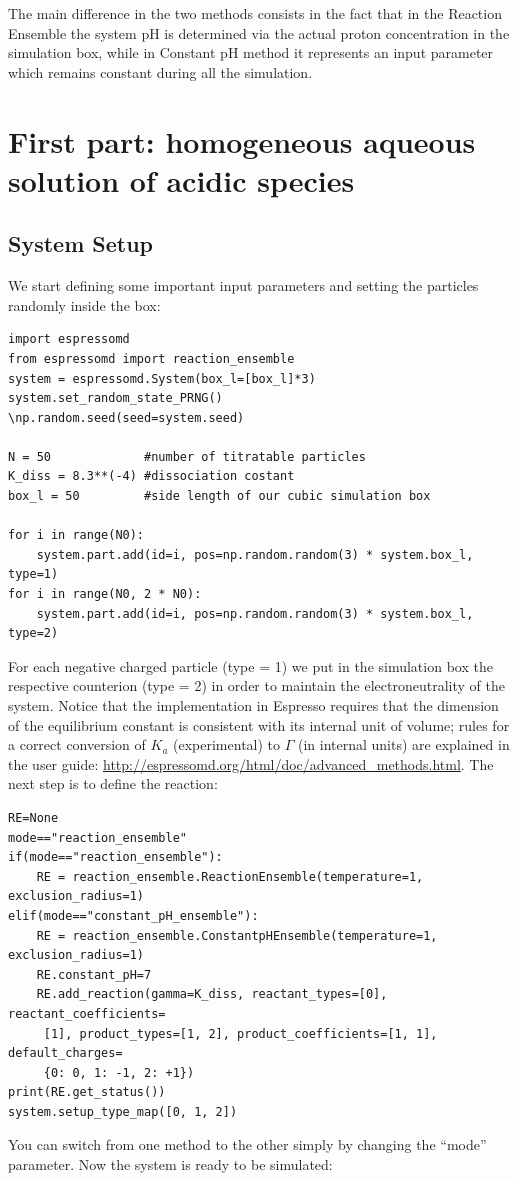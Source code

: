 \documentclass[
a4paper,                        %
11pt,                           %
twoside,                        %
footsepline,                    %
headsepline,                    %
headexclude,                    %
footexclude,                    %
pagesize,                       %
]{scrartcl}
\begin{document}
The main difference in the two methods consists in the fact that in the Reaction Ensemble the system pH is determined via the actual proton concentration in the simulation box, while in Constant pH method it represents an input parameter which remains constant during all the simulation.


\section{First part: homogeneous aqueous solution of acidic species}

\subsection{System Setup}

We start defining some important input parameters and setting the particles randomly inside the box:
\begin{verbatim}
import espressomd
from espressomd import reaction_ensemble
system = espressomd.System(box_l=[box_l]*3)
system.set_random_state_PRNG()
\np.random.seed(seed=system.seed)

N = 50             #number of titratable particles
K_diss = 8.3**(-4) #dissociation costant 
box_l = 50         #side length of our cubic simulation box 

for i in range(N0):
    system.part.add(id=i, pos=np.random.random(3) * system.box_l, type=1)
for i in range(N0, 2 * N0):
    system.part.add(id=i, pos=np.random.random(3) * system.box_l, type=2)
\end{verbatim}

For each negative charged  particle (type = 1) we put in the simulation box the respective counterion  (type = 2) in order to maintain the electroneutrality of the system.
Notice that the implementation in Espresso requires that the dimension of the equilibrium constant is consistent with its internal unit of volume; rules for a correct conversion of $K_a$ (experimental) to $\Gamma$ (in internal units) are explained in the user guide: \url{http://espressomd.org/html/doc/advanced_methods.html}. The next step is to define the reaction:

\begin{verbatim}
RE=None
mode=="reaction_ensemble"
if(mode=="reaction_ensemble"):
    RE = reaction_ensemble.ReactionEnsemble(temperature=1, exclusion_radius=1)
elif(mode=="constant_pH_ensemble"):
    RE = reaction_ensemble.ConstantpHEnsemble(temperature=1, exclusion_radius=1)
    RE.constant_pH=7
    RE.add_reaction(gamma=K_diss, reactant_types=[0], reactant_coefficients=
     [1], product_types=[1, 2], product_coefficients=[1, 1], default_charges=
     {0: 0, 1: -1, 2: +1})
print(RE.get_status())
system.setup_type_map([0, 1, 2])
\end{verbatim}
You can switch from one method to the other simply by changing the ``mode'' parameter. Now the system is ready to be simulated:
\end{document}
